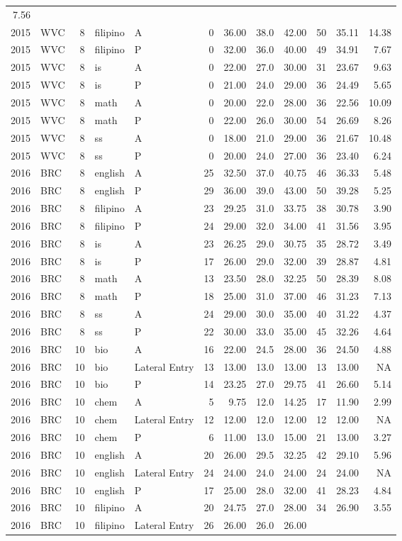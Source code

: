 \documentclass[]{article}
\begin{document}
\begin{longtable}[]{@{}rlrllrrrrrrr@{}}
7.56\tabularnewline
2015 & WVC & 8 & filipino & A & 0 & 36.00 & 38.0 & 42.00 & 50 & 35.11 &
14.38\tabularnewline
2015 & WVC & 8 & filipino & P & 0 & 32.00 & 36.0 & 40.00 & 49 & 34.91 &
7.67\tabularnewline
2015 & WVC & 8 & is & A & 0 & 22.00 & 27.0 & 30.00 & 31 & 23.67 &
9.63\tabularnewline
2015 & WVC & 8 & is & P & 0 & 21.00 & 24.0 & 29.00 & 36 & 24.49 &
5.65\tabularnewline
2015 & WVC & 8 & math & A & 0 & 20.00 & 22.0 & 28.00 & 36 & 22.56 &
10.09\tabularnewline
2015 & WVC & 8 & math & P & 0 & 22.00 & 26.0 & 30.00 & 54 & 26.69 &
8.26\tabularnewline
2015 & WVC & 8 & ss & A & 0 & 18.00 & 21.0 & 29.00 & 36 & 21.67 &
10.48\tabularnewline
2015 & WVC & 8 & ss & P & 0 & 20.00 & 24.0 & 27.00 & 36 & 23.40 &
6.24\tabularnewline
2016 & BRC & 8 & english & A & 25 & 32.50 & 37.0 & 40.75 & 46 & 36.33 &
5.48\tabularnewline
2016 & BRC & 8 & english & P & 29 & 36.00 & 39.0 & 43.00 & 50 & 39.28 &
5.25\tabularnewline
2016 & BRC & 8 & filipino & A & 23 & 29.25 & 31.0 & 33.75 & 38 & 30.78 &
3.90\tabularnewline
2016 & BRC & 8 & filipino & P & 24 & 29.00 & 32.0 & 34.00 & 41 & 31.56 &
3.95\tabularnewline
2016 & BRC & 8 & is & A & 23 & 26.25 & 29.0 & 30.75 & 35 & 28.72 &
3.49\tabularnewline
2016 & BRC & 8 & is & P & 17 & 26.00 & 29.0 & 32.00 & 39 & 28.87 &
4.81\tabularnewline
2016 & BRC & 8 & math & A & 13 & 23.50 & 28.0 & 32.25 & 50 & 28.39 &
8.08\tabularnewline
2016 & BRC & 8 & math & P & 18 & 25.00 & 31.0 & 37.00 & 46 & 31.23 &
7.13\tabularnewline
2016 & BRC & 8 & ss & A & 24 & 29.00 & 30.0 & 35.00 & 40 & 31.22 &
4.37\tabularnewline
2016 & BRC & 8 & ss & P & 22 & 30.00 & 33.0 & 35.00 & 45 & 32.26 &
4.64\tabularnewline
2016 & BRC & 10 & bio & A & 16 & 22.00 & 24.5 & 28.00 & 36 & 24.50 &
4.88\tabularnewline
2016 & BRC & 10 & bio & Lateral Entry & 13 & 13.00 & 13.0 & 13.00 & 13 &
13.00 & NA\tabularnewline
2016 & BRC & 10 & bio & P & 14 & 23.25 & 27.0 & 29.75 & 41 & 26.60 &
5.14\tabularnewline
2016 & BRC & 10 & chem & A & 5 & 9.75 & 12.0 & 14.25 & 17 & 11.90 &
2.99\tabularnewline
2016 & BRC & 10 & chem & Lateral Entry & 12 & 12.00 & 12.0 & 12.00 & 12
& 12.00 & NA\tabularnewline
2016 & BRC & 10 & chem & P & 6 & 11.00 & 13.0 & 15.00 & 21 & 13.00 &
3.27\tabularnewline
2016 & BRC & 10 & english & A & 20 & 26.00 & 29.5 & 32.25 & 42 & 29.10 &
5.96\tabularnewline
2016 & BRC & 10 & english & Lateral Entry & 24 & 24.00 & 24.0 & 24.00 &
24 & 24.00 & NA\tabularnewline
2016 & BRC & 10 & english & P & 17 & 25.00 & 28.0 & 32.00 & 41 & 28.23 &
4.84\tabularnewline
2016 & BRC & 10 & filipino & A & 20 & 24.75 & 27.0 & 28.00 & 34 & 26.90
& 3.55\tabularnewline
2016 & BRC & 10 & filipino & Lateral Entry & 26 & 26.00 & 26.0 & 26.00 &

\end{longtable}
\end{document}
